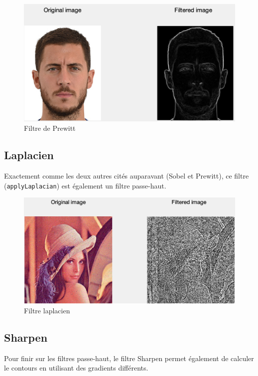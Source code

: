 \documentclass[12pt,a4paper]{article}
\begin{document}
\begin{figure}[H]
\centering
\includegraphics[scale=0.5]{img/prewitt}
\caption{Filtre de Prewitt}
\end{figure}

\subsection{Laplacien}
Exactement comme les deux autres cités  auparavant (Sobel et Prewitt), ce filtre (\texttt{applyLaplacian}) est également un filtre passe-haut. 

\begin{figure}[H]
\centering
\includegraphics[scale=0.5]{img/laplacien}
\caption{Filtre laplacien}
\end{figure}

\subsection{Sharpen}
Pour finir sur les filtres passe-haut, le filtre Sharpen permet également de calculer le contours en utilisant des gradients différents.
\end{document}
